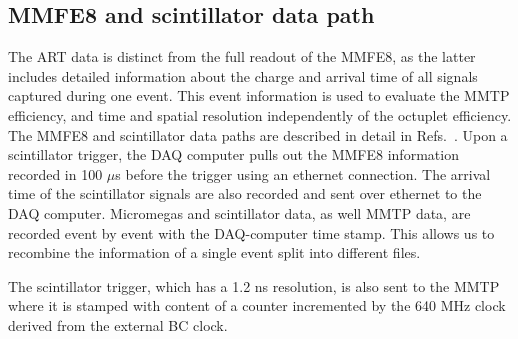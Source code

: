 \subsection{MMFE8 and scintillator data path}
\label{sec:exp-mmfe}
The ART data is distinct from the full readout of the MMFE8, as the latter includes detailed information about the charge and arrival
time of all signals captured during one event. This event information is used to evaluate the MMTP efficiency, and
time and spatial resolution independently of the octuplet efficiency.
The MMFE8 and scintillator data paths are described in detail in Refs.~\cite{noisy,noiseless}. Upon a scintillator trigger, the DAQ computer pulls out 
 the MMFE8 information recorded  in 100 $\mu$s before the trigger using an ethernet connection. 
 The arrival time of the scintillator signals are also recorded
 and sent over ethernet to the DAQ computer. Micromegas and scintillator data, as well MMTP data, are recorded event by event with the DAQ-computer time stamp.
 This allows us to recombine the information of a single event split into different files. 

 The scintillator trigger, which has a 1.2 ns resolution, is also sent to the MMTP where it is stamped with content of a counter incremented by  the  640 MHz 
clock derived from  the external BC clock.




